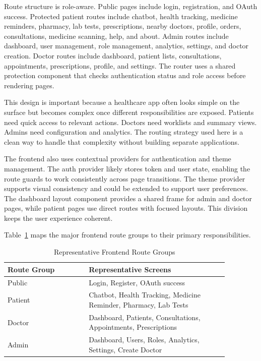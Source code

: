 \documentclass[conference]{IEEEtran}
\begin{document}
Route structure is role-aware. Public pages include login, registration, and OAuth success. Protected patient routes include chatbot, health tracking, medicine reminders, pharmacy, lab tests, prescriptions, nearby doctors, profile, orders, consultations, medicine scanning, help, and about. Admin routes include dashboard, user management, role management, analytics, settings, and doctor creation. Doctor routes include dashboard, patient lists, consultations, appointments, prescriptions, profile, and settings. The router uses a shared protection component that checks authentication status and role access before rendering pages.

This design is important because a healthcare app often looks simple on the surface but becomes complex once different responsibilities are exposed. Patients need quick access to relevant actions. Doctors need worklists and summary views. Admins need configuration and analytics. The routing strategy used here is a clean way to handle that complexity without building separate applications.

The frontend also uses contextual providers for authentication and theme management. The auth provider likely stores token and user state, enabling the route guards to work consistently across page transitions. The theme provider supports visual consistency and could be extended to support user preferences. The dashboard layout component provides a shared frame for admin and doctor pages, while patient pages use direct routes with focused layouts. This division keeps the user experience coherent.

Table~\ref{tab:routes} maps the major frontend route groups to their primary responsibilities.

\begin{table}[H]
\centering
\caption{Representative Frontend Route Groups}
\label{tab:routes}
\begin{tabular}{p{0.32\linewidth} p{0.55\linewidth}}
\toprule
\textbf{Route Group} & \textbf{Representative Screens} \\
\midrule
Public & Login, Register, OAuth success \\
Patient & Chatbot, Health Tracking, Medicine Reminder, Pharmacy, Lab Tests \\
Doctor & Dashboard, Patients, Consultations, Appointments, Prescriptions \\
Admin & Dashboard, Users, Roles, Analytics, Settings, Create Doctor \\
\bottomrule
\end{tabular}
\end{table}
\end{document}

